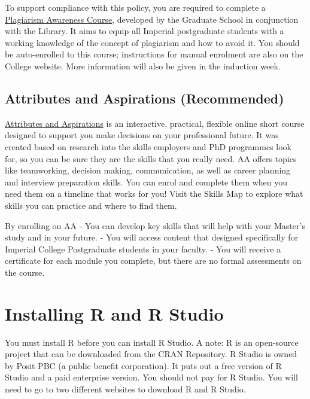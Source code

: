 \documentclass[
]{book}
\begin{document}
To support compliance with this policy, you are required to complete a \href{https://www.imperial.ac.uk/early-career-researcher-institute/learning-and-development/courses-by-programme/research-integrity-ethics-and-sustainability/plagiarism-masters/}{Plagiarism Awareness Course}, developed by the Graduate School in conjunction with the Library. It aims to equip all Imperial postgraduate students with a working knowledge of the concept of plagiarism and how to avoid it.
You should be auto-enrolled to this course; instructions for manual enrolment are also on the College website. More information will also be given in the induction week.

\section{Attributes and Aspirations (Recommended)}\label{attributes-and-aspirations-recommended}

\href{https://www.imperial.ac.uk/students/attributes-and-aspirations/pgt/}{Attributes and Aspirations} is an interactive, practical, flexible online short course designed to support you make decisions on your professional future. It was created based on research into the skills employers and PhD programmes look for, so you can be sure they are the skills that you really need.
AA offers topics like teamworking, decision making, communication, as well as career planning and interview preparation skills. You can enrol and complete them when you need them on a timeline that works for you! Visit the Skills Map to explore what skills you can practice and where to find them.

By enrolling on AA
- You can develop key skills that will help with your Master's study and in your future.
- You will access content that designed specifically for Imperial College Postgraduate students in your faculty.
- You will receive a certificate for each module you complete, but there are no formal assessments on the course.

\chapter{Installing R and R Studio}\label{installing-r-and-r-studio}

You must install R before you can install R Studio. A note: R is an open-source project that can be downloaded from the CRAN Repository. R Studio is owned by Posit PBC (a public benefit corporation). It puts out a free version of R Studio and a paid enterprise version. You should not pay for R Studio. You will need to go to two different websites to download R and R Studio.
\end{document}
